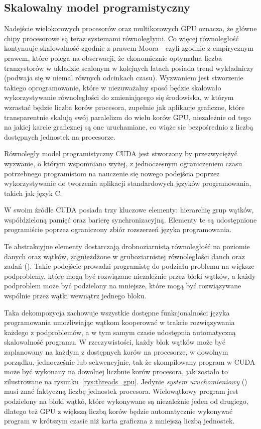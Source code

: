 \subsection{Skalowalny model programistyczny}
Nadejście wielokorowych procesorów oraz multikorowych GPU oznacza, że główne chipy procesorowe są teraz systemami równoległymi. Co więcej równoległość kontynuuje skalowalność zgodnie z prawem Moora - czyli zgodnie z empirycznym prawem, które polega na obserwacji, że ekonomicznie optymalna liczba tranzystorów w układzie scalonym w kolejnych latach posiada trend wykładniczy (podwaja się w niemal równych odcinkach czasu). Wyzwaniem jest stworzenie takiego oprogramowanie, które w niezuważalny sposó będzie skalowało wykorzystywanie równoległości do zmieniającego się środowiska, w którym wzrastać będzie liczba korów procesora, zupełnie jak aplikacje graficzne, które transparentnie skalują swój paralelizm do wielu korów GPU, niezależnie od tego na jakiej karcie graficznej są one uruchamiane, co wiąże sie bezpośrednio z liczbą dostępnych jednostek na procesorze.

Równoległy model programistyczny CUDA jest stworzony by przezwyciężyć wyzwanie, o którym wspomniano wyżej, z jednoczesnym ograniczeniem czasu potrzebnego programistom na nauczenie się nowego podejścia poprzez wykorzystywanie do tworzenia aplikacji standardowych języków programowania, takich jak język C.

W swoim źródle CUDA posiada trzy kluczowe elementy: hierarchię grup wątków, współdzieloną pamięć oraz barierę synchronizacyjną. Elementy te są udostępnione programiście poprzez ograniczony zbiór rozszerzeń języka programowania.

Te abstrakcyjne elementy dostarczają drobnoziarnistą równoległość na poziomie danych oraz wątków, zagnieżdżone w gruboziarnistej równoległości danch oraz zadań (). Takie podejście prowadzi programistę do podziału problemu na większe podproblemy, które mogą być rozwiązane niezależnie przez bloki wątków, a każdy podproblem może być podzielony na mniejsze, które mogą być rozwiązywane wspólnie przez wątki wewnątrz jednego bloku.

Taka dekompozycja zachowuje wszystkie dostępne funkcjonalności języka programowania umożliwiając wątkom kooperować w trakcie rozwiązywania każdego z podproblemów, a w tym samym czasie udostępnia automatyczną skalowalność programu. W rzeczywistości, każdy blok wątków może być zaplanowany na każdym z dostępnych korów na procesorze, w dowolnym porządku, jednocześnie lub sekwencyjnie, tak że skompilowany program w CUDA może być wykonany na dowolnej liczbnie korów procesora, jak zostało to zilustrowane na rysunku~\ref{rys:threads_gpu}. Jedynie \emph{system uruchomieniowy} () musi znać faktyczną liczbę jednostek procesora. Wielowątkowy program jest podzielony na bloki wątkó, które wykonywane są niezależnie jeden od drugiego, dlatego też GPU z większą liczbą korów będzie automatycznie wykonywać program w krótszym czasie niż karta graficzna z mniejszą liczbą jednostek.

